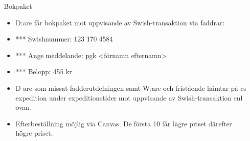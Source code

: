 \documentclass{lecturenotes}
\begin{document}


\begin{Slide}{Bokpaket}
  \begin{itemize}
    \item D:are får bokpaket mot uppvisande av Swish-transaktion via faddrar:
    \item[] *** Swishnummer: 123 170 4584
    \item[] *** Ange meddelande: pgk <förnamn efternamn>
    \item[] *** Belopp: 455 kr 
    \item D-are som missat fadderutdelningen samt W:are och fristående hämtar på cs expedition under expeditionstider mot uppvisande av Swish-transaktion enl ovan.
    \item Efterbeställning möjlig via Canvas. De första 10 får lägre priset därefter högre priset.
  \end{itemize}
\end{Slide}
\end{document}
